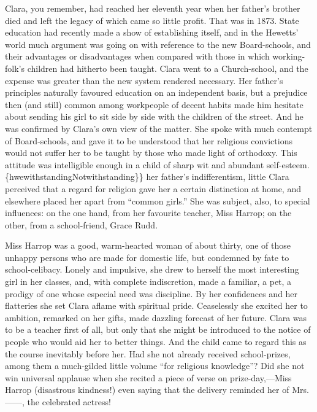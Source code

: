 Clara, you remember, had reached her eleventh year when her father's
brother died {}and left the legacy of which came so little profit. That
was in 1873. State education had recently made a show of establishing
itself, and in the Hewetts' world much argument was going on with
reference to the new Board-schools, and their advantages or
disadvantages when compared with those in which working-folk's children
had hitherto been taught. Clara went to a Church-school, and the expense
was greater than the new system rendered necessary. Her father's
principles naturally favoured education on an independent basis, but a
prejudice then (and still) common among workpeople of decent habits made
him hesitate about sending his girl to sit side by side with the
children of the street. And he was confirmed by Clara's own view of the
matter. She spoke with much contempt of Board-schools, and gave it to be
understood that her religious convictions would not suffer her to be
taught by those who made light of orthodoxy. This attitude was
intelligible enough in a child of sharp wit and abundant self-esteem.
{}\{hwe\textbar{}withstanding\textbar{}Notwithstanding\}\} her father's
indifferentism, little Clara perceived that a regard for religion gave
her a certain distinction at home, and elsewhere placed her apart from
``common girls.'' She was subject, also, to special influences: on the
one hand, from her favourite teacher, Miss Harrop; on the other, from a
school-friend, Grace Rudd.

Miss Harrop was a good, warm-hearted woman of about thirty, one of those
unhappy persons who are made for domestic life, but condemned by fate to
school-celibacy. Lonely and impulsive, she drew to herself the most
interesting girl in her classes, and, with complete indiscretion, made a
familiar, a pet, a prodigy of one whose especial need was discipline. By
her confidences and her flatteries she set Clara aflame with spiritual
pride. Ceaselessly she excited her to ambition, remarked on her gifts,
made dazzling forecast of her future. Clara was to be a teacher first of
all, but only that she might be introduced to the notice of people who
would aid her to better things. And the {}child came to regard this as
the course inevitably before her. Had she not already received
school-prizes, among them a much-gilded little volume ``for religious
knowledge''? Did she not win universal applause when she recited a piece
of verse on prize-day,---Miss Harrop (disastrous kindness!) even saying
that the delivery reminded her of Mrs. {{------}}, the celebrated
actress!

